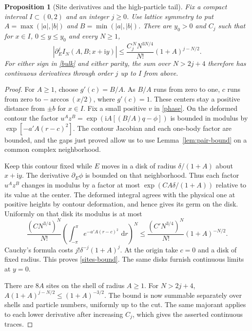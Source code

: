 \documentclass[11pt]{article}
\newtheorem{proposition}[lemma]{Proposition}
\newcommand{\ii}{\mathrm i}
\newcommand{\dd}{\,\mathrm d}
\begin{document}
\begin{proposition}[Site derivatives and the high-particle tail]\label{prop:site}
Fix a compact interval $I\subset(0,2)$ and an integer $j\ge0$.
Use lattice symmetry to put $A=\max(|a|,|b|)$ and $B=\min(|a|,|b|)$.
There are $y_0>0$ and $C_j$ such that for $x\in I$, $0\le y\le y_0$
and every $N\ge1$,
\begin{equation}\label{sites-bound}
 |\partial_E^j I_N(A,B;x+\ii y)|\le
 \frac{C_j^{\,N}N^{3N/4}}{N!}(1+A)^{j-N/2}.
\end{equation}
For either sign in \eqref{bulk} and either parity, the sum over
$N>2j+4$ therefore has continuous derivatives through order $j$ up
to $I$ from above.
\end{proposition}
\begin{proof}
For $A\ge1$, choose $g'(c)=B/A$. As $B/A$ runs from zero to one,
$c$ runs from zero to $-\arccos(x/2)$, where $g'(c)=1$.
These centers stay a positive distance from $\pm b$ for $x\in I$.
Fix a small positive $v$ in \eqref{phase}. On the deformed contour
the factor $u^A z^B=\exp(\ii A[(B/A)q-\phi])$ is bounded in modulus by
$\exp[-a' A(r-c)^2]$. The contour Jacobian and each one-body factor
are bounded, and the gaps just proved allow us to use
Lemma~\ref{lem:pair-bound} on a common complex neighborhood.

Keep this contour fixed while $E$ moves in a disk of radius
$\delta/(1+A)$ about $x+\ii y$. The derivative $\partial_E\phi$
is bounded on that neighborhood. Thus each factor $u^A z^B$ changes
in modulus by a factor at most $\exp(CA\delta/(1+A))$ relative to
its value at the center. The deformed integral agrees with the
physical one at positive heights by contour deformation, and hence
gives its germ on the disk. Uniformly on that disk its modulus is
at most
\[
 \frac{(C N^{3/4})^N}{N!}
 \left(\int_{-\pi}^{\pi}e^{-a'A(r-c)^2}\,\dd r\right)^N
 \le \frac{(C' N^{3/4})^N}{N!}(1+A)^{-N/2}.
\]
Cauchy's formula costs $j!\delta^{-j}(1+A)^j$. At the origin take
$c=0$ and a disk of fixed radius. This proves \eqref{sites-bound}.
The same disks furnish continuous limits at $y=0$.

There are $8A$ sites on the shell of radius $A\ge1$. For $N>2j+4$,
$A(1+A)^{j-N/2}\le (1+A)^{-3/2}$. The bound is now summable
separately over shells and particle numbers, uniformly up to the cut.
The same majorant applies to each lower derivative after increasing
$C_j$, which gives the asserted continuous traces.
\end{proof}
\end{document}

